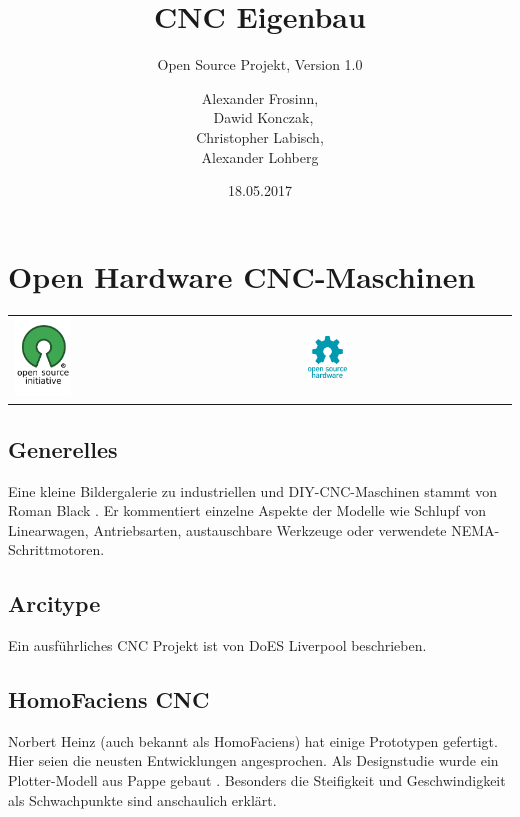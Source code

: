 \documentclass[
	a4paper,
	smallheadings,
	german,
	]
	{scrreprt}
\title{CNC Eigenbau}
\subtitle{Open Source Projekt, Version 1.0}
\date{18.05.2017}
\author{Alexander Frosinn, \\ Dawid Konczak, \\ Christopher Labisch, \\ Alexander Lohberg}
\begin{document}
\maketitle
\tableofcontents
\chapter{Open Hardware CNC-Maschinen}
\begin{tabularx}{\textwidth}{XX}
\includegraphics[width=0.2\textwidth]{../Grafiken/Opensource.png} & \includegraphics[width=0.2\textwidth]{../Grafiken/Open-source-hardware-logo.png}
\end{tabularx}
\section{Generelles}
Eine kleine Bildergalerie zu industriellen und DIY-CNC-Maschinen stammt von Roman Black \autocite{:01}.
Er kommentiert einzelne Aspekte der Modelle wie Schlupf von Linearwagen, Antriebsarten, austauschbare Werkzeuge oder verwendete NEMA-Schrittmotoren.


\section{Arcitype}

Ein ausführliches CNC Projekt ist von DoES Liverpool beschrieben. \autocite{:Arcitype}


\section{HomoFaciens CNC}
Norbert Heinz (auch bekannt als HomoFaciens) hat einige Prototypen gefertigt.
Hier seien die neusten Entwicklungen angesprochen.
Als Designstudie wurde ein Plotter-Modell aus Pappe gebaut \autocite{:Heinz_CNC_3.0}.
Besonders die Steifigkeit und Geschwindigkeit als Schwachpunkte sind anschaulich erklärt.
\end{document}
